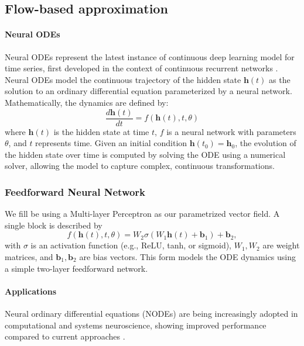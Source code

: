 \documentclass{article}
\theoremstyle{definition} \newtheorem{definition}{Definition}  \newtheorem{example}{Example}
\theoremstyle{remark} \newtheorem{remark}{Remark}
\newcounter{ct}
\begin{document}

\subsection{Flow-based approximation}
\paragraph{Neural ODEs}
Neural ODEs \citep{chen2018neural} represent the latest instance of continuous deep learning model for time series, first developed in the context of continuous recurrent networks \citep{cohen1983absolute}.
%
Neural ODEs model the continuous trajectory of the hidden state \( \mathbf{h}(t) \) as the solution to an ordinary differential equation parameterized by a neural network. Mathematically, the dynamics are defined by:
\[
\frac{d \mathbf{h}(t)}{dt} = f(\mathbf{h}(t), t, \theta)
\]
where \( \mathbf{h}(t) \) is the hidden state at time \( t \), \( f \) is a neural network with parameters \( \theta \), and \( t \) represents time.
Given an initial condition \( \mathbf{h}(t_0) = \mathbf{h}_0 \), the evolution of the hidden state over time is computed by solving the ODE using a numerical solver, allowing the model to capture complex, continuous transformations.

\subsubsection{Feedforward Neural Network}\label{sec:fnn}
We fill be using a Multi-layer Perceptron as our parametrized vector field. 
A single block is described by
\[
f(\mathbf{h}(t), t, \theta) = W_2 \sigma(W_1 \mathbf{h}(t) + \mathbf{b}_1) + \mathbf{b}_2,
\]
with \( \sigma \) is an activation function (e.g., ReLU, tanh, or sigmoid), \( W_1, W_2 \) are weight matrices, and \( \mathbf{b}_1, \mathbf{b}_2 \) are bias vectors.
This form models the ODE dynamics using a simple two-layer feedforward network.





\paragraph{Applications}
Neural ordinary differential equations (NODEs) are being increasingly adopted in computational and systems neuroscience, showing improved performance compared to current approaches \citep{kim2021inferring,geenjaar2023learning,sedler2023expressive,elgazzar2024universal,rubanova2019latent,coelho2024enhancing}.
\end{document}
